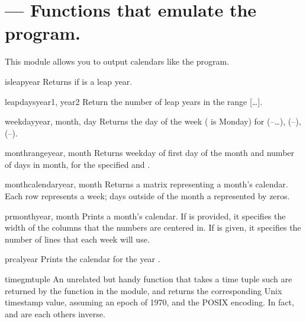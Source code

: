 
\section{ ---
         Functions that emulate the \UNIX{}  program.}



This module allows you to output calendars like the \UNIX{}
 program.

\begin{funcdesc}{isleap}{year}
Returns  if  is a leap year.
\end{funcdesc}

\begin{funcdesc}{leapdays}{year1, year2}
Return the number of leap years in the range
[\ldots{}].
\end{funcdesc}

\begin{funcdesc}{weekday}{year, month, day}
Returns the day of the week ( is Monday) for 
(--\ldots),  (--), 
(--).
\end{funcdesc}

\begin{funcdesc}{monthrange}{year, month}
Returns weekday of first day of the month and number of days in month, 
for the specified  and .
\end{funcdesc}

\begin{funcdesc}{monthcalendar}{year, month}
Returns a matrix representing a month's calendar.  Each row represents
a week; days outside of the month a represented by zeros.
\end{funcdesc}

\begin{funcdesc}{prmonth}{year, month}
Prints a month's calendar.  If  is provided, it specifies
the width of the columns that the numbers are centered in.  If
 is given, it specifies the number of lines that each
week will use.
\end{funcdesc}

\begin{funcdesc}{prcal}{year}
Prints the calendar for the year .
\end{funcdesc}

\begin{funcdesc}{timegm}{tuple}
An unrelated but handy function that takes a time tuple such are
returned by the  function in the 
module, and returns the corresponding Unix timestamp value, assuming
an epoch of 1970, and the POSIX encoding.  In fact,
 and  are each others inverse.
\end{funcdesc}
